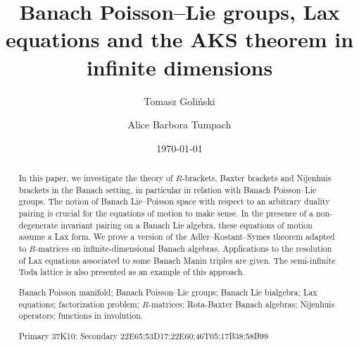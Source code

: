 \documentclass[a4paper,12pt,reqno]{amsart}%
\theoremstyle{definition}
\theoremstyle{remark}
\numberwithin{theorem}{section}
\numberwithin{equation}{section}
\newcommand{\1}{{\bf 1}}
\begin{document}




\title[Banach Poisson--Lie groups, Lax equations and AKS theorem]{Banach Poisson--Lie groups, Lax equations and the AKS theorem in infinite dimensions}

\author[T.~Goli\'nski]{Tomasz Goli\'nski}
\address{University of Bia\l ystok\\ Cio\l kowskiego 1M\\15-245 Bia\l ystok\\ Poland}
\author[A.B.~Tumpach]{Alice Barbora Tumpach}
\address{Institut CNRS Pauli\\ UMI  CNRS 2842\\ Oskar-Morgenstern-Platz,1 \\1090 Wien\\Austria\\ \& UMR CNRS 8524\\
UFR de Math\'ematiques\\
Laboratoire Paul Painlev\'e\\
59 655 Villeneuve d'Ascq Cedex\\
France }

\begin{abstract}
In this paper, we investigate the theory of $R$-brackets, Baxter brackets and Nijenhuis brackets in the Banach setting, in particular in relation with Banach Poisson--Lie groups. The notion of Banach Lie--Poisson space with respect to an arbitrary duality pairing  is crucial for the equations of motion to make sense. In the presence of a non-degenerate invariant pairing on a Banach Lie algebra, these equations of motion assume a Lax form. We prove a version of the Adler--Kostant--Symes theorem adapted to $R$-matrices on infinite-dimensional Banach algebras. Applications to the resolution of Lax equations associated to some Banach Manin triples are given. The semi-infinite Toda lattice is also presented as an example of this approach. 

 Banach Poisson manifold;
Banach Poisson--Lie groups; Banach Lie bialgebra; Lax equations; factorization problem; $R$-matrices; Rota-Baxter Banach algebras; Nijenhuis operators; functions in involution.

 Primary 37K10; Secondary 22E65;53D17;22E60;46T05;17B38;58B99
\end{abstract}

\date{\today}
\end{document}
